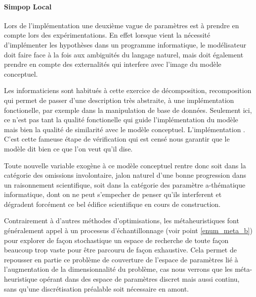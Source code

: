 \paragraph{Simpop Local}




Lors de l'implémentation une deuxième vague de paramètres est à prendre en compte lors des expérimentations. En effet lorsque vient la nécessité d'implémenter les hypothèses dans un programme informatique, le modélisateur doit faire face à la fois aux ambiguités du langage naturel, mais doit également prendre en compte des externalités qui interfere avec l'image du modèle conceptuel.

Les informaticiens sont habitués à cette exercice de décomposition, recomposition qui permet de passer d'une description très abstraite, à une implémentation fonctionelle, par exemple dans la manipulation de base de données. Seulement ici, ce n'est pas tant la qualité fonctionelle qui guide l'implémentation du modèle mais bien la qualité de similarité avec le modèle conceptuel. L'implémentation . C'est cette fameuse étape de vérification qui est censé nous garantir que le modèle dit bien ce que l'on veut qu'il dise.

Toute nouvelle variable exogène à ce modèle conceptuel rentre donc soit dans la catégorie des omissions involontaire, jalon naturel d'une bonne progression dans un raisonnement scientifique, soit dans la catégorie des paramètre a-thématique informatique, dont on ne peut s'empecher de penser qu'ils interferent et dégradent forcément ce bel édifice scientifique en cours de construction.




Contrairement à d'autres méthodes d'optimisations, les métaheuristiques font généralement appel à un processus d'échantillonnage (voir point \ref{enum_meta_b}) pour explorer de façon stochastique un espace de recherche de toute façon beaucoup trop vaste pour être parcouru de façon exhaustive. Cela permet de repousser en partie ce problème de couverture de l'espace de paramètres lié à l'augmentation de la dimensionnalité du problème, cas nous verrons que les méta-heuristique opérant dans des espace de paramètres discret mais aussi continu, sans qu'une discrétisation préalable soit nécessaire en amont.

